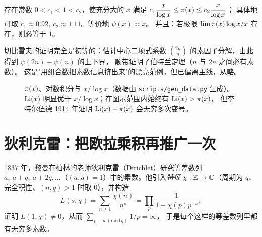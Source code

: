 \begin{theorem}[Chebyshev, 1848/1850]
存在常数 $0<c_1<1<c_2$，使充分大的 $x$ 满足
$c_1\dfrac{x}{\log x}\le\pi(x)\le c_2\dfrac{x}{\log x}$；
具体地可取 $c_1\approx0.92,\ c_2\approx1.11$。等价地 $\psi(x)\asymp x$。
并且：若极限 $\lim \pi(x)\log x/x$ 存在，则必等于 $1$。
\end{theorem}

切比雪夫的证明完全是初等的：估计中心二项式系数
$\binom{2n}{n}$ 的素因子分解，由此得到 $\psi(2n)-\psi(n)$ 的上下界，
顺带证明了伯特兰定理（$n$ 与 $2n$ 之间必有素数）。
这是"用组合数把素数信息挤出来"的漂亮范例，但已偏离主线，从略。

\begin{figure}[htbp]
\centering
{}
\caption{$\pi(x)$、对数积分与 $x/\log x$（数据由 \texttt{scripts/gen\_data.py} 生成）。
$\operatorname{Li}(x)$ 明显优于 $x/\log x$；在图示范围内始终有 $\operatorname{Li}(x)>\pi(x)$，
但李特尔伍德 1914 年证明 $\operatorname{Li}(x)-\pi(x)$ 会无穷多次变号。}
\label{fig:01-pi-li}
\end{figure}

\section{狄利克雷：把欧拉乘积再推广一次}
\label{sec:01-dirichlet}

1837 年，黎曼在柏林的老师狄利克雷（Dirichlet）研究等差数列
$a,\ a+q,\ a+2q,\dots$（$(a,q)=1$）中的素数。他引入\emph{特征}
$\chi:\mathbb{Z}\to\mathbb{C}$（周期为 $q$、完全积性、$(n,q)>1$ 时取 $0$），并构造
\begin{equation}\label{eq:01-L}
  L(s,\chi)=\sum_{n\ge1}\frac{\chi(n)}{n^s}
  =\prod_p\frac{1}{1-\chi(p)p^{-s}},
\end{equation}
证明 $L(1,\chi)\ne0$，从而 $\sum_{p\equiv a\ (\mathrm{mod}\ q)}1/p=\infty$，
于是每个这样的等差数列里都有无穷多素数。

